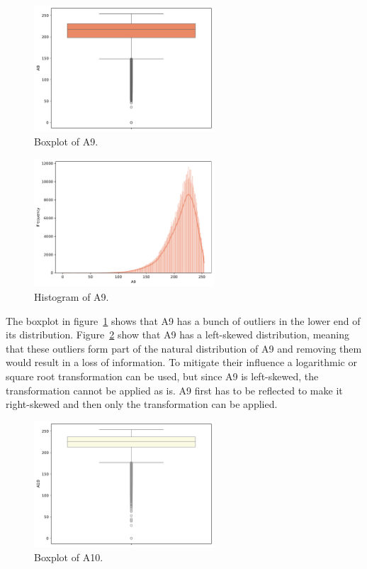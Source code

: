 \documentclass[11pt]{report}
\begin{document}
\begin{figure}[H]
    \centering
    \includegraphics[width=0.6\textwidth]{images/A9_boxplot.pdf}
    \caption{Boxplot of A9.}
    \label{fig:a9_boxplot}
\end{figure}

\begin{figure}[H]
    \centering
    \includegraphics[width=0.6\textwidth]{images/A9_histplot.pdf}
    \caption{Histogram of A9.}
    \label{fig:a9_histplot}
\end{figure}

The boxplot in figure~\ref{fig:a9_boxplot} shows that A9 has a bunch of outliers in the lower end of its distribution. Figure~\ref{fig:a9_histplot} show that A9 has a left-skewed distribution, meaning that these outliers form part of the natural distribution of A9 and removing them would result in a loss of information. To mitigate their influence a logarithmic or square root transformation can be used, but since A9 is left-skewed, the transformation cannot be applied as is. A9 first has to be reflected to make it right-skewed and then only the transformation can be applied.

\begin{figure}[H]
    \centering
    \includegraphics[width=0.6\textwidth]{images/A10_boxplot.pdf}
    \caption{Boxplot of A10.}
    \label{fig:a10_boxplot}
\end{figure}
\end{document}
